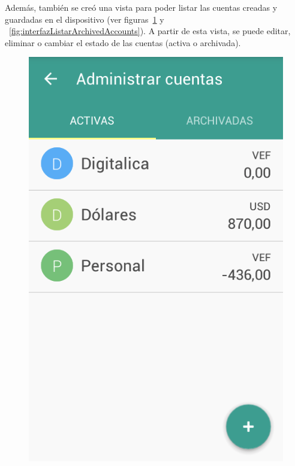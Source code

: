Además, también se creó una vista para poder listar las cuentas creadas y guardadas en el dispositivo (ver figuras~\ref{fig:interfazListarActiveAccounts} y ~\ref{fig:interfazListarArchivedAccounts}). A partir de esta vista, se puede editar, eliminar o cambiar el estado de las cuentas (activa o archivada).


\begin{figure}[ht]
\centering
\begin{minipage}{.5\textwidth}
  \centering
  \includegraphics[scale=0.45,type=png,ext=.png,read=.png]{imagenes/active_accounts}
  \captionsetup{justification=centering}
  \label{fig:interfazListarActiveAccounts}
\end{minipage}%

\end{figure}
